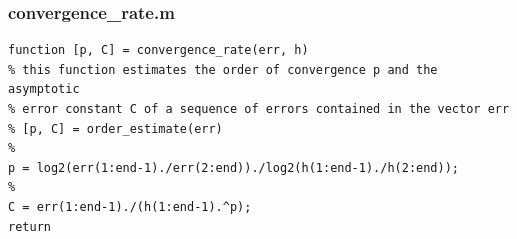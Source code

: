 \documentclass{article}
\begin{document}
    \subsubsection{convergence\_rate.m}
        \begin{lstlisting}[style=matlab-editor]
            function [p, C] = convergence_rate(err, h)
% this function estimates the order of convergence p and the asymptotic 
% error constant C of a sequence of errors contained in the vector err
% [p, C] = order_estimate(err)
%
p = log2(err(1:end-1)./err(2:end))./log2(h(1:end-1)./h(2:end));
%
C = err(1:end-1)./(h(1:end-1).^p);
return
        \end{lstlisting}
\end{document}
